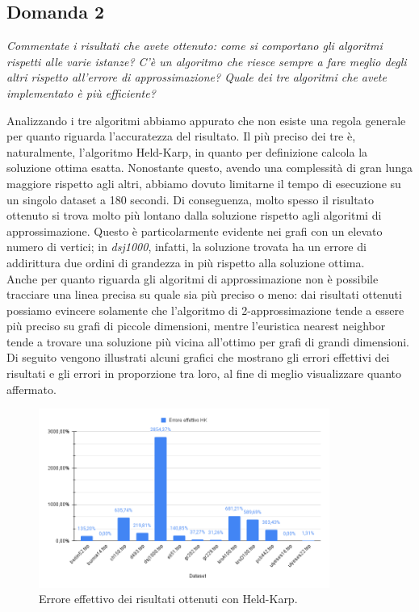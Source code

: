 \subsection{Domanda 2}
\textit{Commentate i risultati che avete ottenuto: come si comportano gli algoritmi rispetti alle varie istanze?
C'è un algoritmo che riesce sempre a fare meglio degli altri rispetto all'errore di approssimazione? Quale dei tre
algoritmi che avete implementato è più efficiente?}

Analizzando i tre algoritmi abbiamo appurato che non esiste una regola generale per quanto riguarda l'accuratezza del risultato. Il più preciso dei tre è, naturalmente, l'algoritmo Held-Karp, in quanto per definizione calcola la soluzione ottima esatta. 
Nonostante questo, avendo una complessità di gran lunga maggiore rispetto agli altri, abbiamo dovuto limitarne il tempo di esecuzione su un singolo dataset a 180 secondi. Di conseguenza, molto spesso il risultato ottenuto si trova molto più lontano dalla soluzione rispetto agli algoritmi di approssimazione.
Questo è particolarmente evidente nei grafi con un elevato numero di vertici; in \textit{dsj1000}, infatti, la soluzione trovata ha un errore di addirittura due ordini di grandezza in più rispetto alla soluzione ottima. \\
Anche per quanto riguarda gli algoritmi di approssimazione non è possibile tracciare una linea precisa su quale sia più preciso o meno: dai risultati ottenuti possiamo evincere solamente che l'algoritmo di 2-approssimazione tende a essere più preciso su grafi di piccole dimensioni, mentre l'euristica nearest neighbor tende a trovare una soluzione più vicina all'ottimo per grafi di grandi dimensioni. \\
Di seguito vengono illustrati alcuni grafici che mostrano gli errori effettivi dei risultati e gli errori in proporzione tra loro, al fine di meglio visualizzare quanto affermato.

\begin{figure}[H]
	\centering
	\includegraphics[width=0.85\textwidth]{res/images/errors/hk-effettivo.png}
	\caption{Errore effettivo dei risultati ottenuti con Held-Karp.}
	\label{fig:errors-hk-effettivo}
\end{figure}

